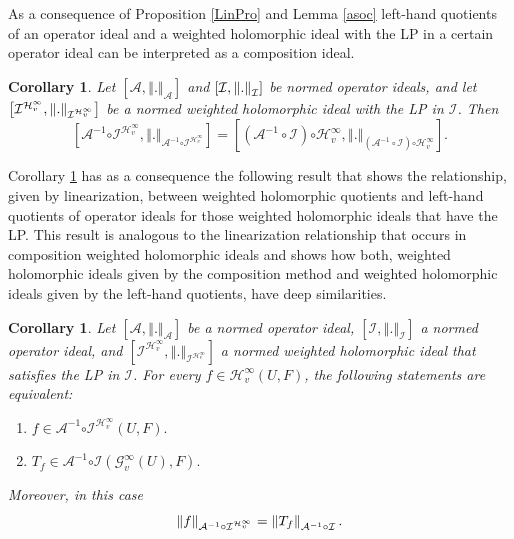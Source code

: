 \documentclass[12pt]{amsart}
\theoremstyle{plain}
\newtheorem{corollary}[theorem]{Corollary}
\numberwithin{equation}{section}
\begin{document}
As a consequence of Proposition \ref{LinPro}  and  Lemma \ref{asoc} left-hand quotients of an operator ideal and a weighted holomorphic ideal
with the LP in a certain operator ideal can be interpreted as a composition
ideal. 

\begin{corollary}\label{com}
Let $\left[ \mathcal{A},\left\Vert .\right\Vert _{\mathcal{A}}\right] $ and $\left[ \mathcal{I},\left\Vert .\right\Vert _{%
\mathcal{I}}\right] $ be normed operator ideals, and let $\left[ \mathcal{I}^{%
\mathcal{H}_{v}^{\infty }},\left\Vert .\right\Vert _{\mathcal{I}^{\mathcal{H}%
_{v}^{\infty }}}\right] $ be a normed weighted holomorphic ideal with the LP in 
$\mathcal{I}$. Then%
\begin{equation*}
\left[ \mathcal{A}^{-1}\mathcal{\circ I}^{\mathcal{H}_{v}^{\infty
}},\left\Vert .\right\Vert _{\mathcal{A}^{-1}\mathcal{\circ I}^{\mathcal{H}%
_{v}^{\infty }}}\right] =\left[ \left( \mathcal{A}^{-1}\circ \mathcal{I}%
\right) \mathcal{\circ H}_{v}^{\infty },\left\Vert .\right\Vert _{\left( 
\mathcal{A}^{-1}\circ \mathcal{I}\right) \mathcal{\circ H}_{v}^{\infty }}%
\right] .
\end{equation*}
\end{corollary}

Corollary \ref{com} has as a consequence the following result that shows the relationship, given by linearization, between
weighted holomorphic quotients and left-hand quotients of operator ideals
for those weighted holomorphic ideals that have the LP. This result is analogous to the linearization relationship that occurs in composition weighted holomorphic ideals and shows how both, weighted holomorphic ideals given by the composition method and weighted holomorphic ideals given by the left-hand quotients, have deep  similarities. 

\begin{corollary}
\label{4}Let $\left[ \mathcal{A},\left\Vert .\right\Vert _{\mathcal{A}}%
\right] $ be a normed operator ideal, $\left[ \mathcal{I},\left\Vert
.\right\Vert _{\mathcal{I}}\right] $ a normed operator ideal, and $\left[ 
\mathcal{I}^{\mathcal{H}_{v}^{\infty }},\left\Vert .\right\Vert _{\mathcal{I}%
^{\mathcal{H}_{v}^{\infty }}}\right] $ a normed weighted holomorphic ideal
that satisfies the LP in $\mathcal{I}$. For every $f\in \mathcal{H}%
_{v}^{\infty }(U,F)$, the following statements are equivalent:

\begin{enumerate}
\item[(i)] $f\in \mathcal{A}^{-1}\mathcal{\circ I}^{\mathcal{H}_{v}^{\infty
}}\left( U,F\right) .$

\item[(ii)] $T_{f}\in \mathcal{A}^{-1}\mathcal{\circ I}\left( \mathcal{G}%
_{v}^{\infty }(U),F\right) .$
\end{enumerate}

Moreover, in this case
\begin{equation*}
\left\Vert f\right\Vert _{\mathcal{A}^{-1}\mathcal{\circ I}^{\mathcal{H}%
_{v}^{\infty }}}=\left\Vert T_{f}\right\Vert _{\mathcal{A}^{-1}\mathcal{%
\circ I}}.
\end{equation*}
\end{corollary}
\end{document}
